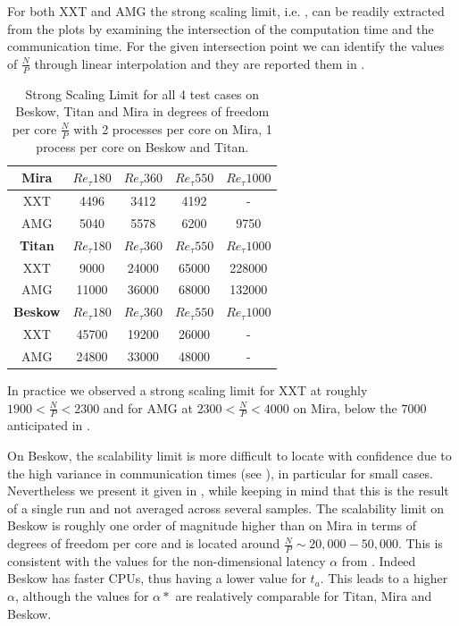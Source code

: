 \documentclass{sig-alternate}
\begin{document}
For both XXT and AMG the strong scaling limit, i.e. , can be readily extracted from the plots by examining the intersection of the computation time 
and the communication time. For the given intersection point we can identify the values of $\frac{N}{P}$ through linear interpolation and they are reported them in .

\begin{table}  
  \caption{Strong Scaling Limit for all 4 test cases on Beskow, Titan and Mira
  in degrees of freedom per core $\frac{N}{P}$ with 2 processes per core on Mira, 1 process per core on Beskow and Titan.}%
  \centering
  \begin{tabular}{c||cccc}
    \hline
    \hline
    {\bf Mira}
    &$Re_{\tau} 180$&$Re_{\tau} 360$&$Re_{\tau} 550$&$Re_{\tau} 1000$\\
    \hline
    XXT&4496&3412&4192&-\\
    AMG&5040&5578&6200&9750\\
    \hline
    \hline
    {\bf Titan}
    &$Re_{\tau} 180$&$Re_{\tau} 360$&$Re_{\tau} 550$&$Re_{\tau} 1000$\\
    \hline
    XXT&9000&24000&65000&228000\\
    AMG&11000&36000&68000&132000\\
    \hline
    \hline
    {\bf Beskow}
    &$Re_{\tau} 180$&$Re_{\tau} 360$&$Re_{\tau} 550$&$Re_{\tau} 1000$\\
    \hline
    XXT&45700&19200&26000& - \\
    AMG&24800&33000&48000& - \\
    \hline
    \hline
  \end{tabular}
  \label{tab:stronglimit}
\end{table}

% 

In practice we observed a strong scaling limit for XXT at roughly $1900<
\frac{N}{P} < 2300$ and for AMG at $2300<\frac{N}{P}<4000$ on Mira, below the $7000$
anticipated in \cite{fischer:scaling}. 

On Beskow, the scalability limit is more difficult to locate with confidence due 
to the high variance in communication times (see ), 
in particular for small cases. Nevertheless we present it given in 
, while keeping in mind that this is the result of a 
single run and not averaged across several samples. The scalability limit on 
Beskow is roughly one order of magnitude higher than on Mira in terms of degrees
of freedom per core and is located around $\frac{N}{P} \sim 20,000 - 50,000$. This 
is consistent with the values for the non-dimensional latency $\alpha$ 
from . Indeed Beskow has faster CPUs, thus having a
lower value for $t_a$. This leads to a higher $\alpha$, although the values for
$\alpha*$ are realatively comparable for Titan, Mira and Beskow. %
\end{document}

